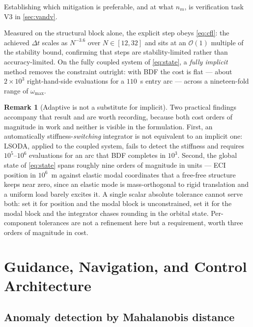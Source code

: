 \documentclass[11pt,a4paper]{article}
\theoremstyle{definition}
\newtheorem{remark}[theorem]{Remark}
\numberwithin{equation}{section}
\begin{document}
Establishing which mitigation is preferable, and at what $n_m$, is verification task V3 in \cref{sec:vandv}.

Measured on the structural block alone, the explicit step obeys \cref{eq:cfl}: the achieved $\Delta t$ scales as $N^{-3.6}$ over $N \in [12,32]$ and sits at an $\mathcal{O}(1)$ multiple of the stability bound, confirming that steps are stability-limited rather than accuracy-limited. On the fully coupled system of \cref{eq:state}, a \emph{fully implicit} method removes the constraint outright: with BDF the cost is flat --- about $2\times10^{3}$ right-hand-side evaluations for a $110$~s entry arc --- across a nineteen-fold range of $\omega_{\max}$.

\begin{remark}[Adaptive is not a substitute for implicit]
\label{rem:lsoda}
Two practical findings accompany that result and are worth recording, because both cost orders of magnitude in work and neither is visible in the formulation. First, an automatically stiffness-\emph{switching} integrator is not equivalent to an implicit one: LSODA, applied to the coupled system, fails to detect the stiffness and requires $10^{5}$--$10^{6}$ evaluations for an arc that BDF completes in $10^{3}$. Second, the global state of \cref{eq:state} spans roughly nine orders of magnitude in units --- ECI position in $10^{6}$~m against elastic modal coordinates that a free-free structure keeps near zero, since an elastic mode is mass-orthogonal to rigid translation and a uniform load barely excites it. A single scalar absolute tolerance cannot serve both: set it for position and the modal block is unconstrained, set it for the modal block and the integrator chases rounding in the orbital state. Per-component tolerances are not a refinement here but a requirement, worth three orders of magnitude in cost.
\end{remark}

\section{Guidance, Navigation, and Control Architecture}
\label{sec:gnc}

\subsection{Anomaly detection by Mahalanobis distance}
\label{sec:mahalanobis}
\end{document}
